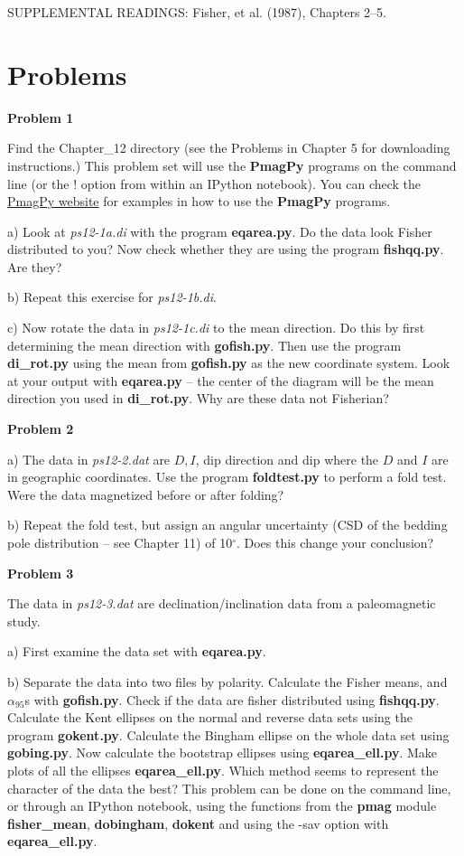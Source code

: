 \vskip 12pt
\noindent SUPPLEMENTAL READINGS: Fisher,  et al. (1987), Chapters 2--5.  \nocite{fisher87}

\vskip 12pt

\section{Problems}

{\parindent 0pt  \parskip 8pt

{\bf Problem 1 }

Find the  Chapter\_12 directory (see the Problems in Chapter 5 for downloading instructions.)    This problem set will use the {\bf PmagPy} programs on the command line (or the ! option from within an IPython notebook).  You can check the \href{http://earthref.org/PmagPy/cookbook/}{PmagPy website} for examples in how to use the {\bf PmagPy} programs. 
 
 a)
Look at {\it ps12-1a.di} with the program {\bf eqarea.py}.  Do the data look Fisher distributed to you?   
Now check whether they are using the program {\bf fishqq.py}.  Are they?   

b) Repeat this exercise for {\it ps12-1b.di}.  

c)  Now rotate the data in {\it ps12-1c.di}  to the mean direction.    Do this by first determining the mean  direction with {\bf gofish.py}.     Then use the program {\bf di\_rot.py} using the mean from {\bf gofish.py} as the new coordinate system.  Look at your output with {\bf eqarea.py} -- the center of the diagram will be the mean direction you used in {\bf di\_rot.py}.   Why are these data not Fisherian?  

{\bf Problem 2} 

a) The data in {\it ps12-2.dat} are $D, I$, dip direction and dip where the $D$ and $I$ are in geographic coordinates.   Use the program {\bf foldtest.py} to perform a fold test.  Were the data magnetized before or after folding?   

b) Repeat the fold test, but assign an angular uncertainty (CSD of the bedding pole distribution -- see Chapter 11) of 10$^{\circ}$.  Does this change your conclusion?  


{\bf Problem 3}

The data in {\it ps12-3.dat} are declination/inclination data from a paleomagnetic study. 

a)  First examine the data set  
with {\bf eqarea.py}.  

b) Separate the data into two files by polarity.   
Calculate the Fisher means, and $\alpha_{95}$s with {\bf gofish.py}.  Check if the data are fisher distributed using {\bf fishqq.py}.   Calculate the Kent ellipses on the normal and reverse data sets using the program {\bf gokent.py}.  Calculate the Bingham ellipse on the whole data set using {\bf gobing.py}.  Now calculate the bootstrap ellipses using {\bf eqarea\_ell.py}.    Make plots of all the ellipses {\bf eqarea\_ell.py}.   Which method seems to represent the character of the data the best?   This problem can be done on the command line, or through an IPython notebook, using the functions from the {\bf pmag} module {\bf fisher\_mean},  {\bf dobingham}, {\bf  dokent} and using the -sav option with  {\bf eqarea\_ell.py}. 

}
